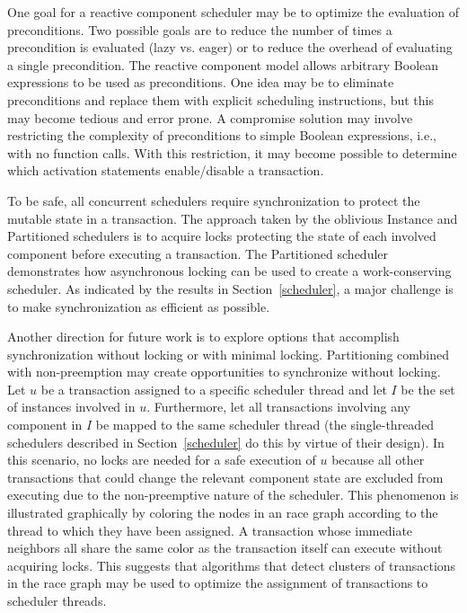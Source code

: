 One goal for a reactive component scheduler may be to optimize the evaluation of preconditions.
Two possible goals are to reduce the number of times a precondition is evaluated (lazy vs. eager) or to reduce the overhead of evaluating a single precondition.
The reactive component model allows arbitrary Boolean expressions to be used as preconditions.
One idea may be to eliminate preconditions and replace them with explicit scheduling instructions, but this may become tedious and error prone.
A compromise solution may involve restricting the complexity of preconditions to simple Boolean expressions, i.e., with no function calls.
With this restriction, it may become possible to determine which activation statements enable/disable a transaction.

To be safe, all concurrent schedulers require synchronization to protect the mutable state in a transaction.
The approach taken by the oblivious Instance and Partitioned schedulers is to acquire locks protecting the state of each involved component before executing a transaction.
The Partitioned scheduler demonstrates how asynchronous locking can be used to create a work-conserving scheduler.
As indicated by the results in Section~\ref{scheduler}, a major challenge is to make synchronization as efficient as possible.

Another direction for future work is to explore options that accomplish synchronization without locking or with minimal locking.
Partitioning combined with non-preemption may create opportunities to synchronize without locking.
Let $u$ be a transaction assigned to a specific scheduler thread and let $I$ be the set of instances involved in $u$.
Furthermore, let all transactions involving any component in $I$ be mapped to the same scheduler thread (the single-threaded schedulers described in Section~\ref{scheduler} do this by virtue of their design).
In this scenario, no locks are needed for a safe execution of $u$ because all other transactions that could change the relevant component state are excluded from executing due to the non-preemptive nature of the scheduler.
This phenomenon is illustrated graphically by coloring the nodes in an race graph according to the thread to which they have been assigned.
A transaction whose immediate neighbors all share the same color as the transaction itself can execute without acquiring locks.
This suggests that algorithms that detect clusters of transactions in the race graph may be used to optimize the assignment of transactions to scheduler threads.

